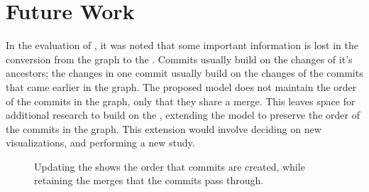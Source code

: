\section{Future Work}\label{sec:future_work}

In the evaluation of \tool{}, it was noted that some important
information is lost in the conversion from the graph to the \mt{}.
Commits usually build on the changes of it's ancestors;
the changes in one commit usually build on the changes of the commits
that came earlier in the graph.
The proposed \mt{} model does not maintain the order of the commits in
the graph, only that they share a merge.
This leaves space for additional research to build on the \mt{},
extending the model to preserve the order of the commits in the graph.
This extension would involve deciding on new visualizations, and
performing a new study.

\begin{figure}[htpb]
  \centering
  \caption{
    Updating the \mt{} shows the order that commits are created,
    while retaining the merges that the commits pass through.}
  \label{fig:updated_mt}
\end{figure}


